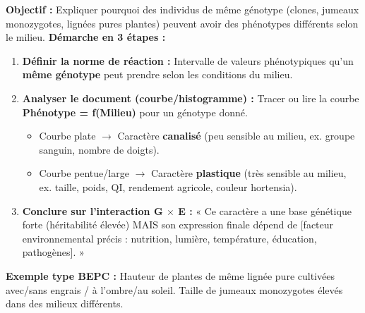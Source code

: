 \documentclass[11pt]{article}
\begin{document}
\begin{methode}
\textbf{Objectif :} Expliquer pourquoi des individus de même génotype (clones, jumeaux monozygotes, lignées pures plantes) peuvent avoir des phénotypes différents selon le milieu.
\textbf{Démarche en 3 étapes :}
\begin{enumerate}
    \item \textbf{Définir la norme de réaction :} Intervalle de valeurs phénotypiques qu'un \textbf{même génotype} peut prendre selon les conditions du milieu.
    \item \textbf{Analyser le document (courbe/histogramme) :} Tracer ou lire la courbe \textbf{Phénotype = f(Milieu)} pour un génotype donné.
    \begin{itemize}
        \item Courbe plate $\rightarrow$ Caractère \textbf{canalisé} (peu sensible au milieu, ex. groupe sanguin, nombre de doigts).
        \item Courbe pentue/large $\rightarrow$ Caractère \textbf{plastique} (très sensible au milieu, ex. taille, poids, QI, rendement agricole, couleur hortensia).
    \end{itemize}
    \item \textbf{Conclure sur l'interaction G $\times$ E :} « Ce caractère a une base génétique forte (héritabilité élevée) MAIS son expression finale dépend de [facteur environnemental précis : nutrition, lumière, température, éducation, pathogènes]. »
\end{enumerate}
\textbf{Exemple type BEPC :} Hauteur de plantes de même lignée pure cultivées avec/sans engrais / à l'ombre/au soleil. Taille de jumeaux monozygotes élevés dans des milieux différents.
\end{methode}
\end{document}
